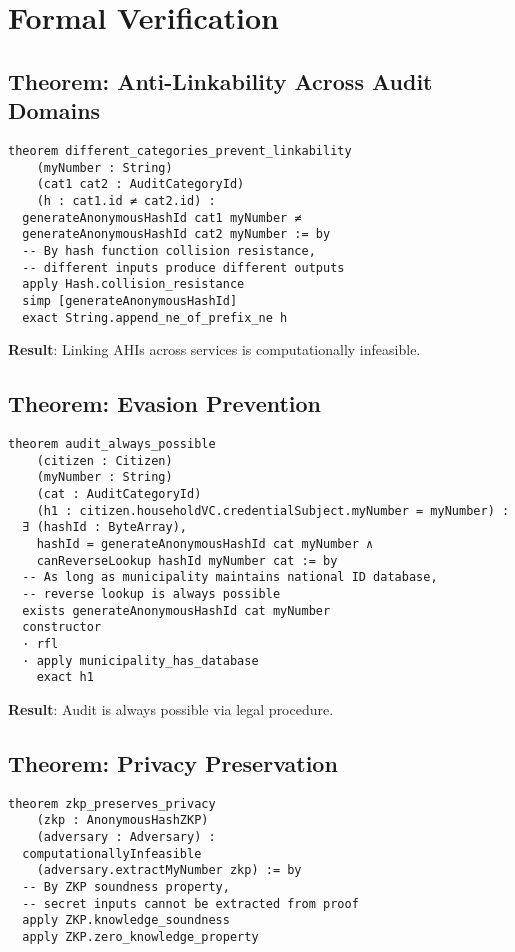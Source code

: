 \section{Formal Verification}

\subsection{Theorem: Anti-Linkability Across Audit Domains}

\begin{lstlisting}[language=Lean]
theorem different_categories_prevent_linkability
    (myNumber : String)
    (cat1 cat2 : AuditCategoryId)
    (h : cat1.id ≠ cat2.id) :
  generateAnonymousHashId cat1 myNumber ≠
  generateAnonymousHashId cat2 myNumber := by
  -- By hash function collision resistance,
  -- different inputs produce different outputs
  apply Hash.collision_resistance
  simp [generateAnonymousHashId]
  exact String.append_ne_of_prefix_ne h
\end{lstlisting}

\textbf{Result}: Linking AHIs across services is computationally infeasible.

\subsection{Theorem: Evasion Prevention}

\begin{lstlisting}[language=Lean]
theorem audit_always_possible
    (citizen : Citizen)
    (myNumber : String)
    (cat : AuditCategoryId)
    (h1 : citizen.householdVC.credentialSubject.myNumber = myNumber) :
  ∃ (hashId : ByteArray),
    hashId = generateAnonymousHashId cat myNumber ∧
    canReverseLookup hashId myNumber cat := by
  -- As long as municipality maintains national ID database,
  -- reverse lookup is always possible
  exists generateAnonymousHashId cat myNumber
  constructor
  · rfl
  · apply municipality_has_database
    exact h1
\end{lstlisting}

\textbf{Result}: Audit is always possible via legal procedure.

\subsection{Theorem: Privacy Preservation}

\begin{lstlisting}[language=Lean]
theorem zkp_preserves_privacy
    (zkp : AnonymousHashZKP)
    (adversary : Adversary) :
  computationallyInfeasible
    (adversary.extractMyNumber zkp) := by
  -- By ZKP soundness property,
  -- secret inputs cannot be extracted from proof
  apply ZKP.knowledge_soundness
  apply ZKP.zero_knowledge_property
\end{lstlisting}

